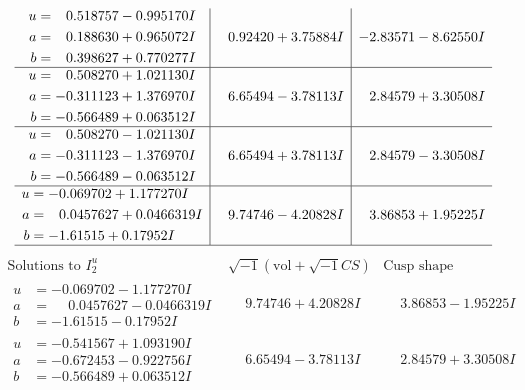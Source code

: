 \documentclass[1p]{elsarticle_modified}
\theoremstyle{definition}
\newcommand{\I}{\sqrt{-1}}
\begin{document}
$$\begin{array}{c|c|c}
\begin{aligned}
u &= \phantom{-}0.518757 - 0.995170 I \\
a &= \phantom{-}0.188630 + 0.965072 I \\
b &= \phantom{-}0.398627 + 0.770277 I\end{aligned}
 & \phantom{-}0.92420 + 3.75884 I & -2.83571 - 8.62550 I \\ \hline\begin{aligned}
u &= \phantom{-}0.508270 + 1.021130 I \\
a &= -0.311123 + 1.376970 I \\
b &= -0.566489 + 0.063512 I\end{aligned}
 & \phantom{-}6.65494 - 3.78113 I & \phantom{-}2.84579 + 3.30508 I \\ \hline\begin{aligned}
u &= \phantom{-}0.508270 - 1.021130 I \\
a &= -0.311123 - 1.376970 I \\
b &= -0.566489 - 0.063512 I\end{aligned}
 & \phantom{-}6.65494 + 3.78113 I & \phantom{-}2.84579 - 3.30508 I \\ \hline\begin{aligned}
u &= -0.069702 + 1.177270 I \\
a &= \phantom{-}0.0457627 + 0.0466319 I \\
b &= -1.61515 + 0.17952 I\end{aligned}
 & \phantom{-}9.74746 - 4.20828 I & \phantom{-}3.86853 + 1.95225 I\\
 \hline 
 \end{array}$$\newpage$$\begin{array}{c|c|c}  
\text{Solutions to }I^u_{2}& \I (\text{vol} + \sqrt{-1}CS) & \text{Cusp shape}\\
 \hline 
\begin{aligned}
u &= -0.069702 - 1.177270 I \\
a &= \phantom{-}0.0457627 - 0.0466319 I \\
b &= -1.61515 - 0.17952 I\end{aligned}
 & \phantom{-}9.74746 + 4.20828 I & \phantom{-}3.86853 - 1.95225 I \\ \hline\begin{aligned}
u &= -0.541567 + 1.093190 I \\
a &= -0.672453 - 0.922756 I \\
b &= -0.566489 + 0.063512 I\end{aligned}
 & \phantom{-}6.65494 - 3.78113 I & \phantom{-}2.84579 + 3.30508 I \\ \hline\begin{aligned}

\end{aligned}
\end{array}$$
\end{document}
